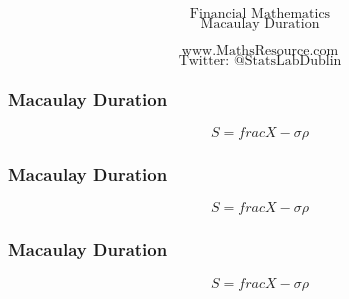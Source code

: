 \documentclass{beamer}
\begin{document}
\begin{frame}
\Huge
\[\mbox{Financial Mathematics}\]
\LARGE
\[\mbox{Macaulay Duration}\]

\Large
\[\mbox{www.MathsResource.com}\]
\[\mbox{Twitter: @StatsLabDublin}\]

\end{frame}
\begin{frame}
\frametitle{Macaulay Duration}
\Large
\[ S = frac{X-\sigma}{\rho}\]
\end{frame}
\begin{frame}
	\frametitle{Macaulay Duration}
	\Large
	\[ S = frac{X-\sigma}{\rho}\]
\end{frame}
\begin{frame}
	\frametitle{Macaulay Duration}
	\Large
	\[ S = frac{X-\sigma}{\rho}\]
\end{frame}
\end{document}

